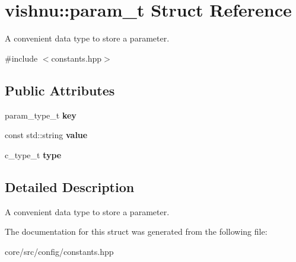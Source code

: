 \hypertarget{structvishnu_1_1param__t}{
\section{vishnu::param\_\-t Struct Reference}
\label{structvishnu_1_1param__t}
}


A convenient data type to store a parameter.  




{\ttfamily \#include $<$constants.hpp$>$}

\subsection*{Public Attributes}
\begin{DoxyCompactItemize}
\item 
\hypertarget{structvishnu_1_1param__t_aa5ddc5895c65c3e15565c237767fe854}{
param\_\-type\_\-t {\bfseries key}}
\label{structvishnu_1_1param__t_aa5ddc5895c65c3e15565c237767fe854}

\item 
\hypertarget{structvishnu_1_1param__t_a0e0ab5147d45a0534874278b4b0d0b61}{
const std::string {\bfseries value}}
\label{structvishnu_1_1param__t_a0e0ab5147d45a0534874278b4b0d0b61}

\item 
\hypertarget{structvishnu_1_1param__t_aea92abf3252828b48153b811a9396b2b}{
c\_\-type\_\-t {\bfseries type}}
\label{structvishnu_1_1param__t_aea92abf3252828b48153b811a9396b2b}

\end{DoxyCompactItemize}


\subsection{Detailed Description}
A convenient data type to store a parameter. 

The documentation for this struct was generated from the following file:\begin{DoxyCompactItemize}
\item 
core/src/config/constants.hpp\end{DoxyCompactItemize}
